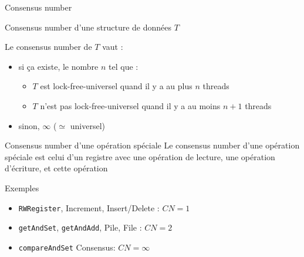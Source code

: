 
\begingroup

\begin{frame}{Consensus number}

  \begin{block}{Consensus number d'une structure de données $T$}

    Le consensus number de $T$ vaut :
    \begin{itemize}
    \item si ça existe, le nombre $n$ tel que : 
      \begin{itemize}
      \item $T$ est lock-free-universel quand il y a au plus $n$ threads%
      \item $T$ n'est pas lock-free-universel quand il y a au moins $n+1$ threads%
      \end{itemize}
    \item sinon, $\infty$ ($\simeq$ universel)
    \end{itemize}

  \end{block}
  
  \begin{block}{Consensus number d'une opération spéciale}
    Le consensus number d'une opération spéciale est celui d'un registre
    avec une opération de lecture, une opération d'écriture, et cette opération
  \end{block}
  
  \begin{exampleblock}{Exemples}
    \begin{itemize}
    \item \lstinline{RWRegister}, Increment, Insert/Delete : $CN = 1$
    \item \lstinline{getAndSet}, \lstinline{getAndAdd}, Pile, File : $CN = 2$
    \item \lstinline{compareAndSet} Consensus: $CN = \infty$
    \end{itemize}
  \end{exampleblock}

\end{frame}

\endgroup
\endinput
